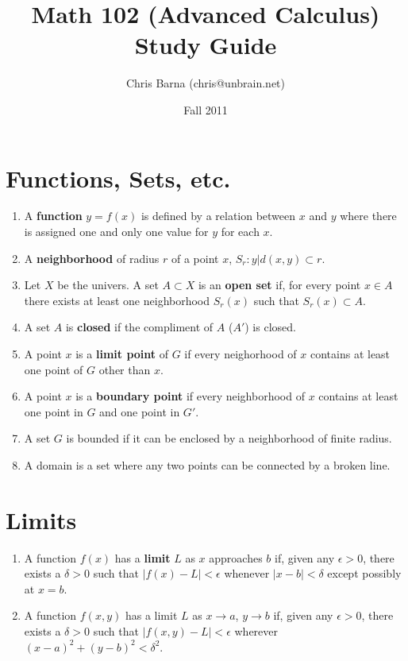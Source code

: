 \documentclass{article}
\begin{document}
\title{Math 102 (Advanced Calculus) Study Guide}
\author{Chris Barna (chris@unbrain.net)}
\date{Fall 2011}

\maketitle

\section{Functions, Sets, etc.}
\begin{enumerate}
  \item A \textbf{function} $y=f(x)$ is defined by a relation between $x$ and
    $y$ where there is assigned one and only one value for $y$ for each $x$.
  \item A \textbf{neighborhood} of radius $r$ of a point $x$,
    $S_r: {y|d(x,y) \subset r}$.
  \item Let $X$ be the univers. A set $A \subset X$ is an \textbf{open set} if,
    for every point $x \in A$ there exists at least one neighborhood $S_r(x)$
    such that $S_r(x) \subset A$.
  \item A set $A$ is \textbf{closed} if the compliment of $A$ ($A'$) is closed.
  \item A point $x$ is a \textbf{limit point} of $G$ if every neighorhood of
    $x$ contains at least one point of $G$ other than $x$.
  \item A point $x$ is a \textbf{boundary point} if every neighborhood of $x$
    contains at least one point in $G$ and one point in $G'$.
  \item A set $G$ is bounded if it can be enclosed by a neighborhood of finite
    radius.
  \item A domain is a set where any two points can be connected by a broken
    line.
\end{enumerate}

\section{Limits}
\begin{enumerate}
  \item A function $f(x)$ has a \textbf{limit} $L$ as $x$ approaches $b$ if,
    given any $\epsilon > 0$, there exists a $\delta > 0$ such that $|f(x) - L| <
    \epsilon$ whenever $|x-b| < \delta$ except possibly at $x=b$.
  \item A function $f(x,y)$ has a limit $L$ as $x \to a$, $y \to b$ if, given
    any $\epsilon > 0$, there exists a $\delta > 0$ such that
    $|f(x,y)-L|<\epsilon$ wherever $(x-a)^2+(y-b)^2 < \delta^2$.
\end{enumerate}
\end{document}
